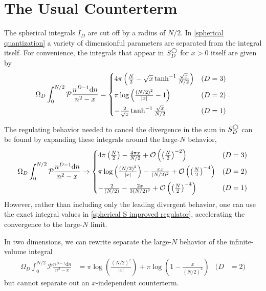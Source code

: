 \section{The Usual Counterterm}\label{sec:counterterm/spherical}

The spherical integrals $I_D$ are cut off by a radius of $N/2$.
In \eqref{spherical quantization} a variety of dimensionful parameters are separated from the integral itself.
For convenience, the integrals that appear in $S_D^\bigcirc$ for $x>0$ itself are given by
\begin{equation}
    \label{eq:spherical S improved regulator}
     \Omega_D \int_0^{N/2}  \mathcal P \frac{ n^{D-1} \mathrm{d}n}{n^2-x} = \begin{cases}
        4\pi\left( \frac{N}{2} - \sqrt{x} \tanh^{-1} \frac{\sqrt{x}}{N/2}\right)
            &   (D=3)\\[0.25cm]
        \pi \log\left( \frac{(N/2)^2}{|x|} - 1\right)
            &   (D=2)\\[0.25cm]
        -\frac{2}{\sqrt{x}} \tanh^{-1} \frac{\sqrt{x}}{N/2}                     &   (D=1)
    \end{cases}.
\end{equation}

The regulating behavior needed to cancel the divergence in the sum in $S_D^\bigcirc$ can be found by expanding these integrals around the large-$N$ behavior,
\begin{equation}
     \Omega_D\int_0^{N/2} \mathcal P \frac{ n^{D-1} \mathrm{d}n}{n^2-x} \rightarrow \begin{cases}
        4\pi \left(\frac{N}{2}\right) - \frac{4 \pi x}{N/2} + \mathcal{O}\left(\left(\frac{N}{2}\right)^{-2}\right)
            &   (D=3)\\[0.25cm]
        \pi \log \left(\frac{(N/2)^2}{|x|}\right) - \frac{\pi x}{(N/2)^2} + \mathcal{O}\left(\left(\frac{N}{2}\right)^{-4}\right)
            &   (D=2)\\[0.25cm]
        -\frac{2}{(N/2)} - \frac{2 x}{3 (N/2)^3} + \mathcal{O}\left(\left(\frac{N}{2}\right)^{-4}\right)
            &   (D=1)
    \end{cases}
\end{equation}
However, rather than including only the leading divergent behavior, one can use the exact integral values in \eqref{spherical S improved regulator}, accelerating the convergence to the large-$N$ limit.

In two dimensions, we can rewrite separate the large-$N$ behavior of the infinite-volume integral
\begin{align}
    \Omega_D\int_0^{N/2} \mathcal P \frac{ n^{D-1} \mathrm{d}n}{n^2-x}
    &=
    \pi \log \left(\frac{(N/2)^2}{|x|}\right) + \pi \log\left(1-\frac{x}{(N/2)^2}\right)
    &
    (D&=2)
\end{align}
but cannot separate out an $x$-independent counterterm.
